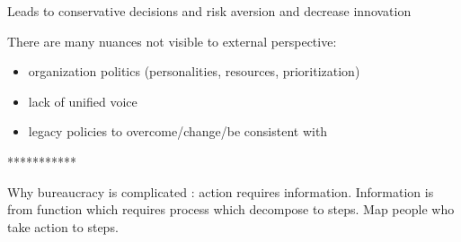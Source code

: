Leads to conservative decisions and risk aversion and decrease innovation

There are many nuances not visible to external perspective:
\begin{itemize}
    \item organization politics (personalities, resources, prioritization)
\item lack of unified voice
\item legacy policies to overcome/change/be consistent with
\end{itemize}

***********

Why bureaucracy is complicated : action requires information. Information is from function which requires process which decompose to steps. Map people who take action to steps.
